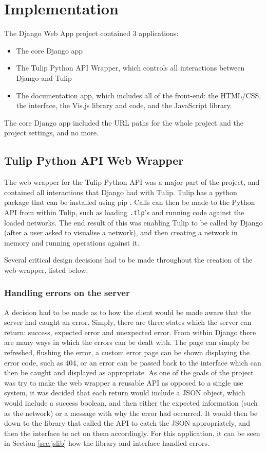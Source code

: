 \documentclass[../dissertation.tex]{subfiles}
\begin{document}
\chapter{Implementation}
\label{chap:impl}

The Django Web App project contained 3 applications: 

\begin{itemize}
    \item The core Django app
    \item The Tulip Python API Wrapper, which controls all interactions between Django and Tulip
    \item The documentation app, which includes all of the front-end: the HTML/CSS, the interface, the Vis.js library and code, and the JavaScript library.
\end{itemize}

The core Django app included the URL paths for the whole project and the project settings, and no more.

\section{Tulip Python API Web Wrapper}

The web wrapper for the Tulip Python API was a major part of the project, and contained all interactions that Django had with Tulip. Tulip has a python package \cite{tulippip} that can be installed using pip \cite{pip}. Calls can then be made to the Python API from within Tulip, such as loading \texttt{.tlp}'s and running code against the loaded networks. The end result of this was enabling Tulip to be called by Django (after a user asked to visualise a network), and then creating a network in memory and running operations against it. 

Several critical design decisions had to be made throughout the creation of the web wrapper, listed below.

\subsection{Handling errors on the server}

A decision had to be made as to how the client would be made aware that the server had caught an error. Simply, there are three states which the server can return: success, expected error and unexpected error. From within Django there are many ways in which the errors can be dealt with. The page can simply be refreshed, flushing the error, a custom error page can be shown displaying the error code, such as 404, or an error can be passed back to the interface which can then be caught and displayed as appropriate. As one of the goals of the project was try to make the web wrapper a reusable API as opposed to a single use system, it was decided that each return would include a JSON object, which would include a success boolean, and then either the expected information (such as the network) or a message with why the error had occurred. It would then be down to the library that called the API to catch the JSON appropriately, and then the interface to act on them accordingly. For this application, it can be seen in Section \ref{sec:jslib} how the library and interface handled errors.
\end{document}
